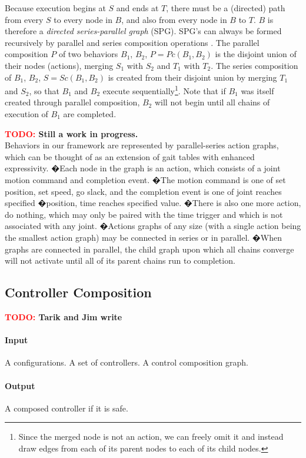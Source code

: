 \documentclass[conference]{IEEEtran}
\theoremstyle{definition}
\newcommand{\TODO}[1]{ {\bf \textcolor{red}{TODO:} #1 }}
\begin{document}
Because execution begins at \(S\) and ends at \(T\), there must be a
(directed) path from every \(S\) to every node in \(B\), and also from every node in \(B\)
to \(T\).  \(B\) is therefore a \textit{directed series-parallel graph} (SPG). SPG's
can always be formed recursively by parallel and series composition operations \cite{SPG}. The
parallel composition \(P\) of two behaviors \(B_1\), \(B_2\), \(P = Pc(B_1, B_2)\)
is the disjoint
union of their nodes (actions), merging \(S_1\) with \(S_2\) and \(T_1\) with \(T_2\). The series
composition of \(B_1\), \(B_2\), \(S = Sc(B_1, B_2)\) is created from their disjoint union by
merging \(T_1\) and \(S_2\), so that \(B_1\) and \(B_2\) execute sequentially\footnote{Since
the merged node is not an action, we can freely omit it and instead draw edges
from each of its parent nodes to each of its child nodes.}.  Note that if \(B_1\) was
itself created through parallel composition, \(B_2\) will not begin until all chains
of execution of \(B_1\) are completed.

\TODO{Still a work in progress.}\\
Behaviors in our framework are represented by parallel-series action graphs,
which can be thought of as an extension of gait tables with enhanced
expressivity. �Each node in the graph is an action, which consists of a joint
motion command and completion event. �The motion command is one of {set
position, set speed, go slack}, and the completion event is one of {joint
reaches specified �position, time reaches specified value}. �There is also one
more action, {do nothing}, which may only be paired with the time trigger and
which is not associated with any joint. �Actions graphs of any size (with a
single action being the smallest action graph) may be connected in series or in
parallel. �When graphs are connected in parallel, the child graph upon which
all chains converge will not activate until all of its parent chains run to
completion.


\subsection{Controller Composition}
\TODO{Tarik and Jim write}
\paragraph{Input}
A configurations. A set of controllers. A control composition graph.
\paragraph{Output}
A composed controller if it is safe.
\end{document}
